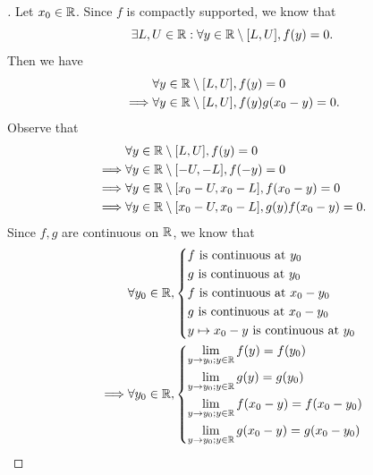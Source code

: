 \begin{proof}[]
  Let \(x_0 \in \mathbb{R}\).
  Since \(f\) is compactly supported, we know that
  \[
    \exists L, U \in \mathbb{R} : \forall y \in \mathbb{R} \setminus [L, U], f(y) = 0.
  \]
  Then we have
  \begin{align*}
             & \forall y \in \mathbb{R} \setminus [L, U], f(y) = 0             \\
    \implies & \forall y \in \mathbb{R} \setminus [L, U], f(y) g(x_0 - y) = 0.
  \end{align*}
  Observe that
  \begin{align*}
             & \forall y \in \mathbb{R} \setminus [L, U], f(y) = 0                         \\
    \implies & \forall y \in \mathbb{R} \setminus [-U, -L], f(-y) = 0                      \\
    \implies & \forall y \in \mathbb{R} \setminus [x_0 - U, x_0 - L], f(x_0 - y) = 0       \\
    \implies & \forall y \in \mathbb{R} \setminus [x_0 - U, x_0 - L], g(y) f(x_0 - y) = 0.
  \end{align*}
  Since \(f, g\) are continuous on \(\mathbb{R}\), we know that
  \begin{align*}
             & \forall y_0 \in \R, \begin{dcases}
                                     f \text{ is continuous at } y_0       \\
                                     g \text{ is continuous at } y_0       \\
                                     f \text{ is continuous at } x_0 - y_0 \\
                                     g \text{ is continuous at } x_0 - y_0 \\
                                     y \mapsto x_0 - y \text{ is continuous at } y_0
                                   \end{dcases}                    \\
    \implies & \forall y_0 \in \R, \begin{dcases}
                                     \lim_{y \to y_0 ; y \in \R} f(y) = f(y_0)             \\
                                     \lim_{y \to y_0 ; y \in \R} g(y) = g(y_0)             \\
                                     \lim_{y \to y_0 ; y \in \R} f(x_0 - y) = f(x_0 - y_0) \\
                                     \lim_{y \to y_0 ; y \in \R} g(x_0 - y) = g(x_0 - y_0)

\end{dcases}
\end{align*}
\end{proof}
